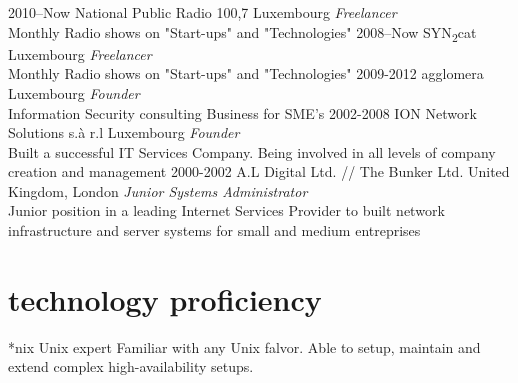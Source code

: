 \documentclass[]{friggeri-cv} %
\begin{document}
\begin{entrylist}
\entry
{2010--Now}
{National Public Radio 100,7}
{Luxembourg}
{\emph{Freelancer} \\
Monthly Radio shows on "Start-ups" and "Technologies"}
\entry
{2008--Now}
{SYN\textsubscript{2}cat}
{Luxembourg}
{\emph{Freelancer} \\
Monthly Radio shows on "Start-ups" and "Technologies"}
\entry
{2009-2012}
{agglomera}
{Luxembourg}
{\emph{Founder} \\
Information Security consulting Business for SME's}
\entry
{2002-2008}
{ION Network Solutions s.\`{a} r.l}
{Luxembourg}
{\emph{Founder} \\
Built a successful IT Services Company. Being involved in all levels of company creation and management}
\entry
{2000-2002}
{A.L Digital Ltd. // The Bunker Ltd.}
{United Kingdom, London}
{\emph{Junior Systems Administrator} \\
Junior position in a leading Internet Services Provider to built network infrastructure and server systems for small and medium entreprises}
\end{entrylist}

\newpage


\section{technology proficiency}

\begin{entrylist}
\entry
{*nix}
{Unix expert}
{}
{Familiar with any Unix falvor. Able to setup, maintain and extend complex high-availability setups.}
\end{entrylist}

\end{document}
